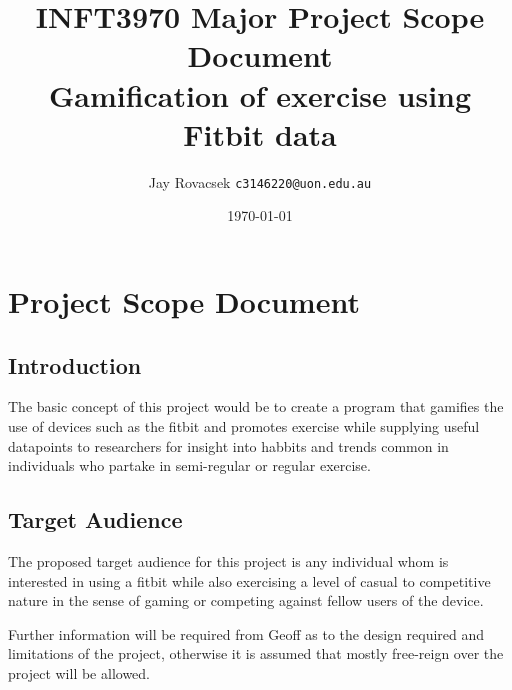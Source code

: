 \documentclass{article}
\title{INFT3970 Major Project Scope Document \protect\\
    Gamification of exercise using Fitbit data}
\author{
        Jay Rovacsek
        \texttt{c3146220@uon.edu.au}
    }
\date{\today}
\begin{document}
    \begin{titlingpage}
        \maketitle
    \end{titlingpage}
    \newpage
    \tableofcontents
    \newpage
    
    \section{Project Scope Document}
        \subsection{Introduction}
        The basic concept of this project would be to create a program that gamifies the use of 
        devices such as the fitbit and promotes exercise while supplying useful datapoints to 
        researchers for insight into habbits and trends common in individuals who partake in 
        semi-regular or regular exercise. 
        \subsection{Target Audience}
        The proposed target audience for this project is any individual whom is interested in using
        a fitbit while also exercising a level of casual to competitive nature in the sense of 
        gaming or competing against fellow users of the device.
        \par
        Further information will be required from Geoff as to the design required and limitations of 
        the project, otherwise it is assumed that mostly free-reign over the project will be allowed.
\end{document}
